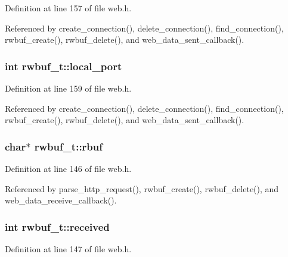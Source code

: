 Definition at line 157 of file web.\-h.



Referenced by create\-\_\-connection(), delete\-\_\-connection(), find\-\_\-connection(), rwbuf\-\_\-create(), rwbuf\-\_\-delete(), and web\-\_\-data\-\_\-sent\-\_\-callback().

\hypertarget{structrwbuf__t_aac758cef289d022f4eb81d4c4fac7f04}{
\subsubsection[{local\-\_\-port}]{\setlength{\rightskip}{0pt plus 5cm}int rwbuf\-\_\-t\-::local\-\_\-port}}\label{structrwbuf__t_aac758cef289d022f4eb81d4c4fac7f04}


Definition at line 159 of file web.\-h.



Referenced by create\-\_\-connection(), delete\-\_\-connection(), find\-\_\-connection(), rwbuf\-\_\-create(), rwbuf\-\_\-delete(), and web\-\_\-data\-\_\-sent\-\_\-callback().

\hypertarget{structrwbuf__t_afd83372241273849c9395d587b146021}{
\subsubsection[{rbuf}]{\setlength{\rightskip}{0pt plus 5cm}char$\ast$ rwbuf\-\_\-t\-::rbuf}}\label{structrwbuf__t_afd83372241273849c9395d587b146021}


Definition at line 146 of file web.\-h.



Referenced by parse\-\_\-http\-\_\-request(), rwbuf\-\_\-create(), rwbuf\-\_\-delete(), and web\-\_\-data\-\_\-receive\-\_\-callback().

\hypertarget{structrwbuf__t_ac76412a0fbf9dc009ae3f8bb20660883}{
\subsubsection[{received}]{\setlength{\rightskip}{0pt plus 5cm}int rwbuf\-\_\-t\-::received}}\label{structrwbuf__t_ac76412a0fbf9dc009ae3f8bb20660883}


Definition at line 147 of file web.\-h.



